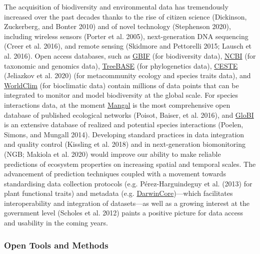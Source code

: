 \documentclass[10pt,oneside]{article}
\begin{document}
The acquisition of biodiversity and environmental data has tremendously
increased over the past decades thanks to the rise of citizen science
(Dickinson, Zuckerberg, and Bonter 2010) and of novel technology
(Stephenson 2020), including wireless sensors (Porter et al. 2005),
next-generation DNA sequencing (Creer et al. 2016), and remote sensing
(Skidmore and Pettorelli 2015; Lausch et al. 2016). Open access
databases, such as \href{https://www.gbif.org/}{GBIF} (for biodiversity
data), \href{https://www.ncbi.nlm.nih.gov/}{NCBI} (for taxonomic and
genomics data),
\href{https://www.treebase.org/treebase-web/home.html}{TreeBASE} (for
phylogenetics data), \href{https://icestes.github.io/}{CESTE} (Jeliazkov
et al. 2020) (for metacommunity ecology and species traits data), and
\href{https://www.worldclim.org/data/bioclim.html}{WorldClim} (for
bioclimatic data) contain millions of data points that can be integrated
to monitor and model biodiversity at the global scale. For species
interactions data, at the moment \href{https://mangal.io/\#/}{Mangal} is
the most comprehensive open database of published ecological networks
(Poisot, Baiser, et al. 2016), and
\href{https://www.globalbioticinteractions.org/about}{GloBI} is an
extensive database of realized and potential species interactions
(Poelen, Simons, and Mungall 2014). Developing standard practices in
data integration and quality control (Kissling et al. 2018) and in
next-generation biomonitoring (NGB; Makiola et al. 2020) would improve
our ability to make reliable predictions of ecosystem properties on
increasing spatial and temporal scales. The advancement of prediction
techniques coupled with a movement towards standardising data collection
protocols (e.g. Pérez-Harguindeguy et al. (2013) for plant functional
traits) and metadata (e.g.
\href{https://www.tdwg.org}{DarwinCore})---which facilitates
interoperability and integration of datasets---as well as a growing
interest at the government level (Scholes et al. 2012) paints a positive
picture for data access and usability in the coming years.

\hypertarget{open-tools-and-methods}{%
\subsubsection{Open Tools and Methods}\label{open-tools-and-methods}}
\end{document}
